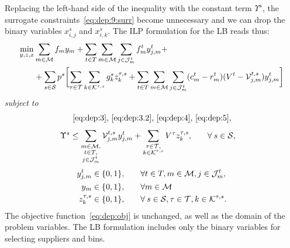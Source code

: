 \documentclass[a4paper,11pt]{article}
\begin{document}
	Replacing the left-hand side of the inequality with the constant term $ \Upsilon^s$, the surrogate constraints~\eqref{eq:dep:9:surr} become unnecessary and we can drop the binary variables $x_{i,j}^{s}$ and $ x_{i,k}^{s}$.
	The ILP formulation for the LB reads thus:
	\begin{equation*}
	\begin{split}
		\min_{y,z,x} & \sum_{m \in \cal M} {f_{m}}y_{m} +  \sum_{t \in T} \sum_{m \in {{\cal M}}} \sum_{j \in {\cal J}_{m}^t} f_{m}^t y_{j,m}^t + \\
		& + \sum_{s \in \cal S} p^{s} \biggl [ \sum_{\tau \in \cal T} \sum_{k \in {\cal K}^{\tau,s}} g^{s}_k z_k^{\tau,s} + \sum_{t \in T} \sum_{m \in {\cal M}} \sum_{j \in {\cal J}^t_{m}} (c_{m}^t-r_{m}^t)(V^{t} - {\cal V}_{j,m}^{t,s}) y_{j,m}^t \biggr]
	\end{split}
	\end{equation*}
	\textit{subject to}
	\begin{equation*}
		\eqref{eq:dep:3}, \, \eqref{eq:dep:3.2}, \, \eqref{eq:dep:4}, \, \eqref{eq:dep:5},
	\end{equation*}
	\begin{alignat}{2}		
		\Upsilon^s
		\leq \sum\limits_{\substack{ m \in {\cal M}, \\ t \in T, \\ j \in {\cal J}^t_{m}}} {\cal V}_{j,m}^{t,s} y_{j,m}^t + \sum\limits_{\substack{\tau \in {\cal T}, \\ k \in {\cal K}^{\tau,s}}} V^{\tau} z_k^{\tau,s}, & \qquad \forall \: s \in {\cal S},\label{eq:deplb:10}
	\end{alignat}
	\begin{alignat*}{2}		
		y_{j,m}^t \in \{0, 1\}, & \qquad \forall t \in T, m \in {\cal M}, j \in {\cal J}^t_{m},\\
		y_{m} \in \{0, 1\}, & \qquad \forall m \in \cal M \\
		z_k^{\tau,s} \in \{0, 1\}, & \qquad \forall \: s \in {\cal S}, \tau \in {\cal T} , k \in {\cal K}^{\tau,s}.
	\end{alignat*}
	The objective function~\eqref{eq:dep:obj} is unchanged, as well as the domain of the problem variables.
	The LB formulation includes only the binary variables for selecting suppliers and bins.
	
\end{document}
